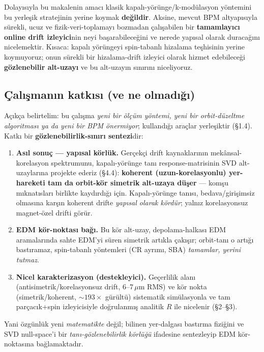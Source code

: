 \documentclass[twocolumn,a4paper,10pt]{article}
\begin{document}
Dolayısıyla bu makalenin amacı klasik kapalı-yörünge/k-modülasyon yöntemini bu
yerleşik stratejinin yerine koymak \textbf{değildir}. Aksine, mevcut BPM
altyapısıyla sürekli, ucuz ve fizik-veri-toplamayı bozmadan çalışabilen bir
\textbf{tamamlayıcı online drift izleyici}nin neyi başarabileceğini ve nerede
yapısal olarak duracağını nicelemektir. Kısaca: kapalı yörüngeyi spin-tabanlı
hizalama teşhisinin yerine koymuyoruz; onun sürekli bir hizalama-drift izleyici
olarak hizmet edebileceği \textbf{gözlenebilir alt-uzayı} ve bu alt-uzayın
sınırını niceliyoruz.

\subsection{Çalışmanın katkısı (ve ne olmadığı)}
Açıkça belirtelim: bu çalışma \emph{yeni bir ölçüm yöntemi, yeni bir orbit-düzeltme
algoritması ya da yeni bir BPM önermiyor}; kullandığı araçlar yerleşiktir (\S1.4).
Katkı bir \textbf{gözlenebilirlik-sınırı sentezi}dir:
\begin{enumerate}
\item \textbf{Asıl sonuç --- yapısal körlük.} Gerçekçi drift kaynaklarının
  mekânsal-korelasyon spektrumunu, kapalı-yörünge tanı response-matrisinin SVD
  alt-uzaylarına projekte ederiz (\S4.4): \textbf{koherent (uzun-korelasyonlu)
  yer-hareketi tam da orbit-kör simetrik alt-uzaya düşer} --- komşu mıknatısları
  birlikte kaydırdığı için. Kapalı-yörünge tanısı, bedava/girişimsiz olmasına
  karşın koherent drifte \emph{yapısal olarak kördür}; yalnız korelasyonsuz
  magnet-özel drifti görür.
\item \textbf{EDM kör-noktası bağı.} Bu kör alt-uzay, depolama-halkası EDM
  aramalarında sahte EDM'yi süren simetrik artıkla çakışır; orbit-tanı o artığı
  bastıramaz, spin-tabanlı yöntemleri (CR ayrımı, SBA) \emph{tamamlar, yerini
  tutmaz}.
\item \textbf{Nicel karakterizasyon (destekleyici).} Geçerlilik alanı
  (antisimetrik/korelasyonsuz drift, 6--7\,$\mu$m RMS) ve kör nokta
  (simetrik/koherent, $\sim 193\times$ gürültü) sistematik simülasyonla ve tam
  parçacık+spin izleyicisiyle doğrulanmış analitik $R$ ile nicelenir (\S2--\S3).
\end{enumerate}
Yani özgünlük yeni \emph{matematikte} değil; bilinen yer-dalgası bastırma fiziğini
\cite{rossbach1989} ve SVD null-space'i \cite{chung1993} bir
\emph{tanı-gözlenebilirlik körlüğü} ifadesine sentezleyip EDM kör-noktasına
bağlamaktadır.
\end{document}
